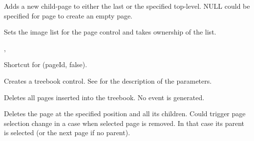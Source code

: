 Adds a new child-page to either the last or the specified top-level.
NULL could be specified for page to create an empty page.



\label{wxtreebookassignimagelist}


Sets the image list for the page control and takes ownership of the list.


, 



\label{wxtreebookcollapsenode}


Shortcut for (pageId, false).



\label{wxtreebookcreate}


Creates a treebook control. See  for the description of the parameters.



\label{wxtreebookdeleteallpages}


Deletes all pages inserted into the treebook. No event is generated.



\label{wxtreebookdeletepage}


Deletes the page at the specified position and all its children. Could trigger page selection change
in a case when selected page is removed. In that case its parent is selected
(or the next page if no parent).



\label{wxtreebookexpandnode}

